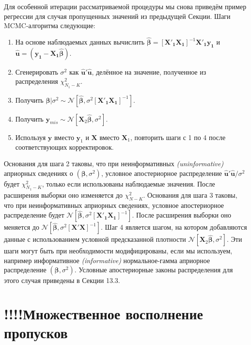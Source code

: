 Для особенной итерации рассматриваемой процедуры мы снова приведём пример регрессии для случая пропущенных значений из предыдущей Секции. Шаги MCMC-алгоритма следующие:
\begin{enumerate}
\item	На основе наблюдаемых данных вычислить $\widehat{\mathbf{\beta}}=[\mathbf{X'_1 X_1}]^{-1}\mathbf{X'_1 y_1}$ и $\widehat{\mathbf{u}}=(\mathbf{y_1-X_1}\widehat{\mathbf{\beta}})$.
\item	Сгенерировать $\sigma^2$ как $\widehat{\mathbf{u}}'\widehat{\mathbf{u}}$, делённое на значение, полученное из распределения $\chi^2_{N_1-K}$.
\item	Получить $\mathbf{\beta}|\sigma^2 \sim \mathcal{N}[\widehat{\mathbf{\beta}}, \sigma^2[\mathbf{X'_1 X_1}]^{-1}]$.
\item	Получить $\mathbf{y}_{mis} \sim \mathcal{N}[\mathbf{X}_2\widehat{\mathbf{\beta}}, \sigma^2]$.
\item	Используя $\mathbf{y}$ вместо $\mathbf{y}_1$ и $\mathbf{X}$ вместо $\mathbf{X}_1$, повторить шаги с 1 по 4 после соответствующих корректировок.
\end{enumerate}

Основания для шага 2 таковы, что при неинформативных \emph{(uninformative)} априорных сведениях о $(\mathbf{\beta}, \sigma^2)$, условное апостериорное распределение $\widehat{\mathbf{u}}'\widehat{\mathbf{u}}/ \sigma^2$ будет $\chi^2_{N_1-K}$, только если использованы наблюдаемые значения. После расширения выборки оно изменяется до $\chi^2_{N-K}$. Основания для шага 3 таковы, что при неинформативных априорных сведениях, условное апостериорное распределение будет $\mathcal{N}[\widehat{\mathbf{\beta}}, \sigma^2[\mathbf{X'_1 X_1}]^{-1}]$. После расширения выборки оно меняется до $\mathcal{N}[\widehat{\mathbf{\beta}}, \sigma^2[\mathbf{X' X}]^{-1}]$. Шаг 4 является шагом, на котором добавляются данные с использованием условной предсказанной плотности $\mathcal{N}[\mathbf{X}_2\widehat{\mathbf{\beta}}, \sigma^2]$. Эти шаги могут быть при необходимости модифицированы, если мы используем, например информативное \emph{(informative)} нормальное-гамма априорное распределение $(\mathbf{\beta}, \sigma^2)$. Условные апостериорные законы распределения для этого случая приведены в Секции 13.3.



\section{!!!!Множественное восполнение пропусков}


